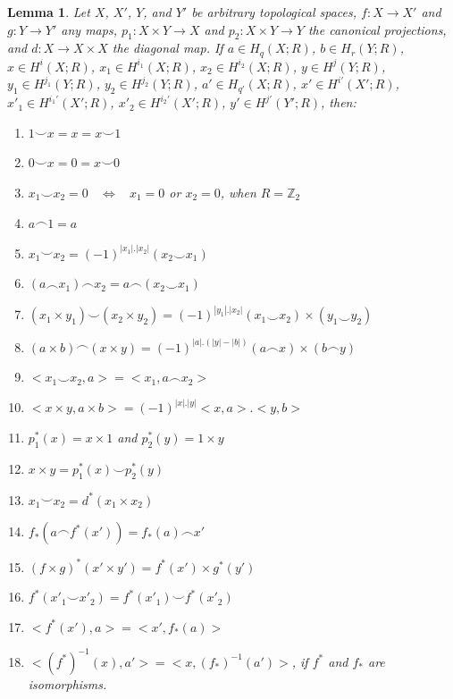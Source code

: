 \documentclass[12pt,oneside]{book}
\newtheorem{lem}    {Lemma}[chapter]
\newcommand{\Z}{\mathbb{Z}}
\newcommand{\ccup}{\smile}
\newcommand{\ccap}{\frown}
\begin{document}
    \begin{lem}\label{propriedades_produtos}
        Let $X$, $X'$, $Y$, and $Y'$ be arbitrary topological spaces, $f:X\to X'$ and $g:Y\to Y'$ any 
        maps, $p_{1}:X\times Y\to X$ and $p_{2}:X\times Y\to Y$ the canonical projections, and 
        $d:X\to X\times X$ the diagonal map. If $a\in H_{q}(X;R)$, $b\in H_{r}(Y;R)$, 
        $x\in H^{i}(X;R)$, $x_{1}\in H^{i_{1}}(X;R)$, $x_{2}\in H^{i_{2}}(X;R)$, $y\in H^{j}(Y;R)$, 
        $y_{1}\in H^{j_{1}}(Y;R)$, $y_{2}\in H^{j_{2}}(Y;R)$, $a'\in H_{q'}(X;R)$, $x'\in H^{i'}(X';R)$, 
        $x'_{1}\in H^{i_{1}'}(X';R)$, $x'_{2}\in H^{i_{2}'}(X';R)$, $y'\in H^{j'}(Y';R)$, then:
    
        \begin{enumerate}
            \item $1\ccup x=x=x\ccup 1$
            \item $0\ccup x=0=x\ccup 0$
            \item $x_{1}\ccup x_{2}=0$ \  $\Longleftrightarrow$ \ $x_{1}=0$ or $x_{2}=0$, when $R=\Z_{2}$
            \item $a\ccap 1=a$
            \item $x_{1}\ccup x_{2}=(-1)^{|x_{1}|.|x_{2}|}(x_{2}\ccup x_{1})$
            \item $(a\ccap x_{1})\ccap x_{2}=a\ccap (x_{2}\ccup x_{1})$
            \item $(x_{1}\times y_{1})\ccup (x_{2}\times y_{2})=(-1)^{|y_{1}|.|x_{2}|}(x_{1}\ccup x_{2})\times (y_{1}\ccup y_{2})$
            \item $(a\times b)\ccap (x\times y)=(-1)^{|a|.(|y|-|b|)}(a\ccap x)\times (b\ccap y)$
            \item $<x_{1}\ccup x_{2},a>=<x_{1},a\ccap x_{2}>$
            \item $<x\times y,a\times b>=(-1)^{|x|.|y|}<x,a>.<y,b>$
            \item $p_{1}^{*}(x)=x\times 1$ and $p_{2}^{*}(y)=1\times y$
            \item $x\times y=p_{1}^{*}(x)\ccup p_{2}^{*}(y)$
            \item $x_{1}\ccup x_{2}=d^{*}(x_{1}\times x_{2})$
            \item $f_{*}(a\ccap f^{*}(x'))=f_{*}(a)\ccap x'$
            \item $(f\times g)^{*}(x'\times y')=f^{*}(x')\times g^{*}(y')$
            \item $f^{*}(x'_{1}\ccup x'_{2})=f^{*}(x'_{1})\ccup f^{*}(x'_{2})$
            \item $<f^{*}(x'),a>=<x',f_{*}(a)>$
            \item $<(f^{*})^{-1}(x),a'>=<x,(f_{*})^{-1}(a')>$, if $f^{*}$ and $f_{*}$ are isomorphisms.
        \end{enumerate}
    \end{lem}
    
\end{document}
